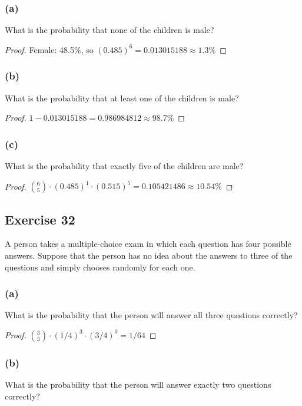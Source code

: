 \documentclass[14pt]{extarticle}
\begin{document}
\subsubsection{(a)}
What is the probability that none of the children is male?

\begin{proof}
Female: 48.5\%, so \((0.485)^6 = 0.013015188 \approx 1.3\%\)
\end{proof}

\subsubsection{(b)}
What is the probability that at least one of the children is male?

\begin{proof}
\(1 - 0.013015188 = 0.986984812 \approx 98.7\%\)
\end{proof}

\subsubsection{(c)}
What is the probability that exactly five of the children are male?

\begin{proof}
\(\binom{6}{5} \cdot (0.485)^1 \cdot (0.515)^5 = 0.105421486 \approx 10.54\%\)
\end{proof}

\subsection{Exercise 32}
A person takes a multiple-choice exam in which each question has four possible answers. Suppose that the person has no idea 
about the answers to three of the questions and simply chooses randomly for each one.

\subsubsection{(a)}
What is the probability that the person will answer all three questions correctly?

\begin{proof}
\(\binom{3}{3} \cdot (1/4)^3 \cdot (3/4)^0 = 1/64\)
\end{proof}

\subsubsection{(b)}
What is the probability that the person will answer exactly two questions correctly?
\end{document}

